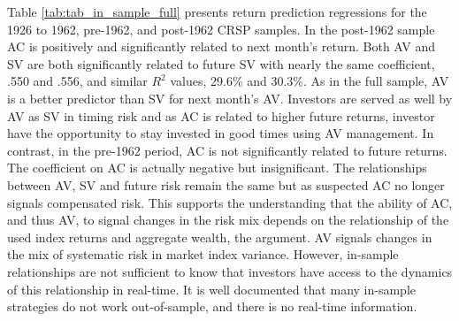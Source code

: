 Table \ref{tab:tab_in_sample_full} presents return prediction regressions for the 1926 to 1962, pre-1962, and post-1962 CRSP samples. In the post-1962 sample AC is positively and significantly related to next month's return. Both AV and SV are both significantly related to future SV with nearly the same coefficient, .550 and .556, and similar $R^{2}$ values, 29.6\% and 30.3\%. As in the full sample, AV is a better predictor than SV for next month's AV. Investors are served as well by AV as SV in timing risk and as AC is related to higher future returns, investor have the opportunity to stay invested in good times using AV management. In contrast, in the pre-1962 period, AC is not significantly related to future returns. The coefficient on AC is actually negative but insignificant. The relationships between AV, SV and future risk remain the same but as suspected AC no longer signals compensated risk. This supports the understanding that the ability of AC, and thus AV, to signal changes in the risk mix depends on the relationship of the used index returns and aggregate wealth, the \citet{pollet_average_2010} argument.
AV signals changes in the mix of systematic risk in market index variance. However, in-sample relationships are not sufficient to know that investors have access to the dynamics of this relationship in real-time. It is well documented that many in-sample strategies do not work out-of-sample, and there is no real-time information.
